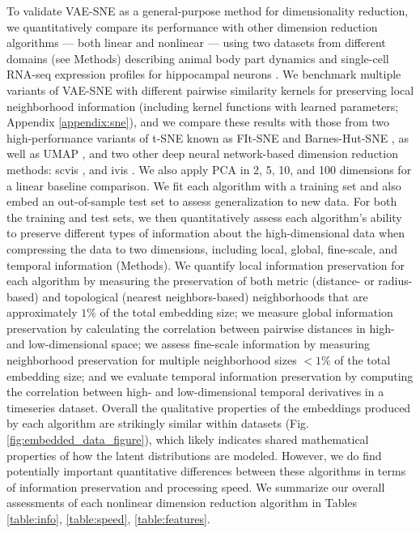 To validate VAE-SNE as a general-purpose method for  dimensionality reduction, we quantitatively compare its performance with other dimension reduction algorithms --- both linear and nonlinear --- using two datasets from different domains (see Methods) describing animal body part dynamics \citep{berman2014mapping, berman2016predictability, pereira2019fast} and single-cell RNA-seq expression profiles for hippocampal neurons \citep{la2018rna}. We benchmark multiple variants of VAE-SNE with different pairwise similarity kernels for preserving local neighborhood information (including kernel functions with learned parameters; Appendix \ref{appendix:sne}), and we compare these results with those from two high-performance variants of t-SNE \citep{maaten2008tsne} known as FIt-SNE \citep{linderman2017efficient, linderman2019fast} and Barnes-Hut-SNE \citep{van2014accelerating}, as well as UMAP \citep{mcinnes2018umap}, and two other deep neural network-based dimension reduction methods: scvis \citep{ding2018scvis}, and ivis \citep{szubert2019ivis}. We also apply PCA in 2, 5, 10, and 100 dimensions for a linear baseline comparison. We fit each algorithm with a training set and also embed an out-of-sample test set to assess generalization to new data. For both the training and test sets, we then quantitatively assess each algorithm's ability to preserve different types of information about the high-dimensional data when compressing the data to two dimensions, including local, global, fine-scale, and temporal information (Methods). We quantify local information preservation for each algorithm by measuring the preservation of both metric (distance- or radius-based) and topological (nearest neighbors-based) neighborhoods that are approximately $1\%$ of the total embedding size; we measure global information preservation by calculating the correlation between pairwise distances in high- and low-dimensional space; we assess fine-scale information by measuring neighborhood preservation for multiple neighborhood sizes $<1\%$ of the total embedding size; and we evaluate temporal information preservation by computing the correlation between high- and low-dimensional temporal derivatives in a timeseries dataset.  Overall the qualitative properties of the embeddings produced by each algorithm are strikingly similar within datasets (Fig. \ref{fig:embedded_data_figure}), which likely indicates shared mathematical properties of how the latent distributions are modeled. However, we do find potentially important quantitative differences between these algorithms in terms of information preservation and processing speed. We summarize our overall assessments of each nonlinear dimension reduction algorithm in Tables \ref{table:info}, \ref{table:speed}, \ref{table:features}.

